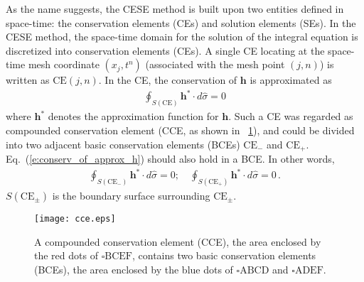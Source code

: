 \documentclass{turgon}
\begin{document}
As the name suggests, the CESE method is built upon two entities defined in
space-time: the conservation elements (CEs) and solution elements (SEs).  In
the CESE method, the space-time domain for the solution of the integral
equation is discretized into conservation elements (CEs).  A single CE locating
at the space-time mesh coordinate $(x_j, t^n)$ (associated with the mesh point
$(j,n)$) is written as $\mathrm{CE}(j,n)$.  In the CE, the conservation of
$\mathbf{h}$ is approximated as
\begin{align}
  \oint_{S(\mathrm{CE})}\mathbf{h}^*\cdot d\hat{\sigma} = 0
  \label{e:conserv_of_approx_h}
\end{align}
where $\mathbf{h}^*$ denotes the approximation function for $\mathbf{h}$.  Such
a CE was regarded as compounded conservation element (CCE, as shown in
\figurename~\ref{f:cce}), and could be divided into two adjacent basic
conservation elements (BCEs) $\mathrm{CE}_-$ and $\mathrm{CE}_+$.
Eq.~(\ref{e:conserv_of_approx_h}) should also hold in a BCE.  In other words,
\begin{align*}
  \oint_{S(\mathrm{CE}_-)}\mathbf{h}^*\cdot d\hat{\sigma} = 0; \quad
  \oint_{S(\mathrm{CE}_+)}\mathbf{h}^*\cdot d\hat{\sigma} = 0
  \,.
\end{align*}
$S(\mathrm{CE}_{\pm})$ is the boundary surface surrounding $\mathrm{CE}_{\pm}$.

\begin{figure}[htbp]
\centering
  \texttt{[image: cce.eps]}
  \caption{A compounded conservation element (CCE), the area enclosed by the
  {\color{red} red} dots of {\color{red} $\square\mathrm{BCEF}$}, contains two
  basic conservation elements (BCEs), the area enclosed by the {\color{blue}
  blue} dots of {\color{blue} $\square\mathrm{ABCD}$} and {\color{blue}
  $\square\mathrm{ADEF}$}.}
  \label{f:cce}
\end{figure}
\end{document}
